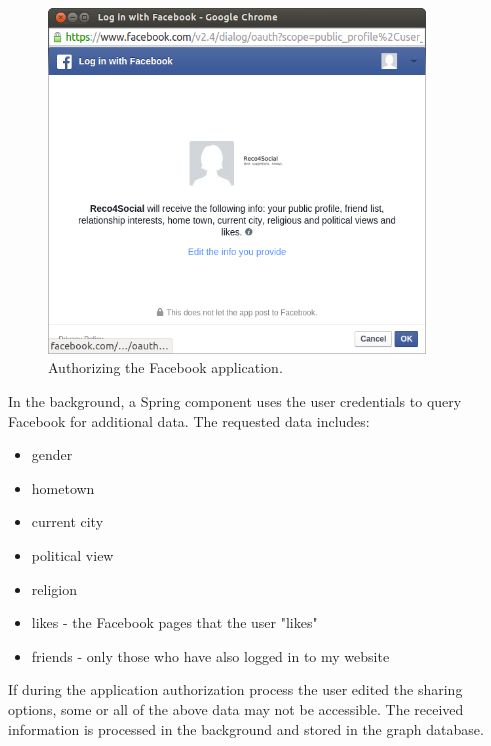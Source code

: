 \documentclass[12pt]{report}
\begin{document}
\begin{figure}
\centering
\includegraphics[width=10cm]{fb_auth.png} 
\caption[Authorizing the Facebook application.]{Authorizing the Facebook application.}
\label{fig.login.fb_app_auth}
\end{figure}

In the background, a Spring component uses the user credentials to query Facebook for additional data. The requested data includes:
\begin{itemize}
\item gender
\item hometown
\item current city
\item political view
\item religion
\item likes - the Facebook pages that the user "likes"
\item friends - only those who have also logged in to my website
\end{itemize}

If during the application authorization process the user edited the sharing options, some or all of the above data may not be accessible. The received information is processed in the background and stored in the graph database.
\end{document}
